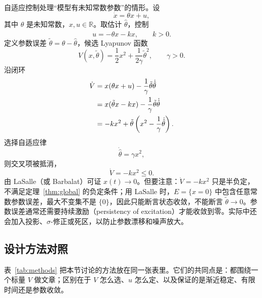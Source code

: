 \documentclass[11pt, a4paper, UTF8, fontset=none]{ctexart}
\theoremstyle{cnthm}
\newcommand{\R}{\mathbb{R}}
\begin{document}
自适应控制处理“模型有未知常数参数”的情形。设
\begin{equation}
  \dot x=\theta x+u,
\end{equation}
其中 $\theta$ 是未知常数，$x,u\in\R$。取估计 $\hat\theta$，控制
\begin{equation}
  u=-\hat\theta x-kx,\qquad k>0.
\end{equation}
定义参数误差 $\tilde\theta=\theta-\hat\theta$，候选 Lyapunov 函数
\begin{equation}
  V(x,\tilde\theta)=\frac12x^2+\frac{1}{2\gamma}\tilde\theta^2,\qquad \gamma>0.
\end{equation}
沿闭环
\begin{align}
  \dot V
  &=x(\theta x+u)-\frac{1}{\gamma}\tilde\theta\dot{\hat\theta}\notag\\
  &=x(\tilde\theta x-kx)-\frac{1}{\gamma}\tilde\theta\dot{\hat\theta}\notag\\
  &=-kx^2+\tilde\theta\left(x^2-\frac{1}{\gamma}\dot{\hat\theta}\right).
\end{align}
选择自适应律
\begin{equation}
  \dot{\hat\theta}=\gamma x^2,
  \label{eq:adaptation}
\end{equation}
则交叉项被抵消，
\begin{equation}
  \dot V=-kx^2\le0.
\end{equation}
由 LaSalle（或 Barbalat）可证 $x(t)\to0$。但要注意：$\dot V=-kx^2$ 只是半负定，不满足定理~\ref{thm:global} 的负定条件；用 LaSalle 时，$E=\{x=0\}$ 中包含任意常数参数误差，最大不变集不是 $\{0\}$，因此只能断言状态收敛，不能断言 $\tilde\theta\to0$。参数误差通常还需要持续激励（persistency of excitation）才能收敛到零。实际中还会加入投影、$\sigma$-修正或死区，以防止参数漂移和噪声放大。

\subsection{设计方法对照}

表~\ref{tab:methods} 把本节讨论的方法放在同一张表里。它们的共同点是：都围绕一个标量 $V$ 做文章；区别在于 $V$ 怎么选、$u$ 怎么定、以及保证的是渐近稳定、有限时间还是参数收敛。
\end{document}
